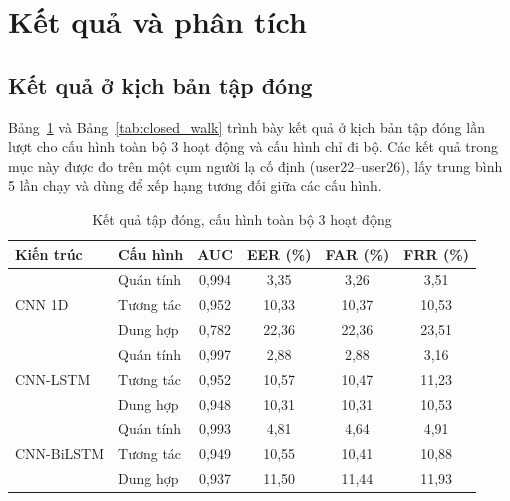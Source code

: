 \documentclass[../DoAn.tex]{subfiles}
\begin{document}
\section{Kết quả và phân tích}
\label{sec:ketqua}

\subsection{Kết quả ở kịch bản tập đóng}

Bảng~\ref{tab:closed_all} và Bảng~\ref{tab:closed_walk} trình bày kết quả ở kịch bản tập đóng lần lượt cho cấu hình toàn bộ 3 hoạt động và cấu hình chỉ đi bộ. Các kết quả trong mục này được đo trên một cụm người lạ cố định (user22--user26), lấy trung bình 5 lần chạy và dùng để xếp hạng tương đối giữa các cấu hình.

\begin{table}[H]
    \centering
    \caption{Kết quả tập đóng, cấu hình toàn bộ 3 hoạt động}
    \label{tab:closed_all}
    \begin{tabular}{|l|l|c|c|c|c|}
    \hline
    \textbf{Kiến trúc} & \textbf{Cấu hình} & \textbf{AUC} & \textbf{EER (\%)} & \textbf{FAR (\%)} & \textbf{FRR (\%)} \\
    \hline
    \multirow{3}{*}{CNN 1D}     & Quán tính & 0,994 & 3,35  & 3,26  & 3,51 \\
                                & Tương tác & 0,952 & 10,33 & 10,37 & 10,53 \\
                                & Dung hợp  & 0,782 & 22,36 & 22,36 & 23,51 \\
    \hline
    \multirow{3}{*}{CNN-LSTM}   & Quán tính & 0,997 & 2,88  & 2,88  & 3,16 \\
                                & Tương tác & 0,952 & 10,57 & 10,47 & 11,23 \\
                                & Dung hợp  & 0,948 & 10,31 & 10,31 & 10,53 \\
    \hline
    \multirow{3}{*}{CNN-BiLSTM} & Quán tính & 0,993 & 4,81  & 4,64  & 4,91 \\
                                & Tương tác & 0,949 & 10,55 & 10,41 & 10,88 \\
                                & Dung hợp  & 0,937 & 11,50 & 11,44 & 11,93 \\
    \hline
    \end{tabular}
\end{table}
\end{document}
